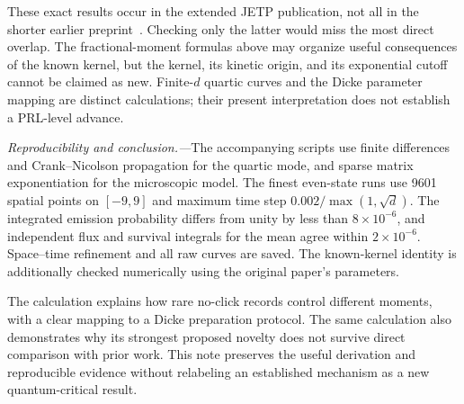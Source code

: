 \documentclass[aps,prl,reprint,superscriptaddress,nofootinbib]{revtex4-2}
\begin{document}
These exact results occur in the extended JETP publication, not all in the shorter earlier preprint~\cite{Efremov}. Checking only the latter would miss the most direct overlap. The fractional-moment formulas above may organize useful consequences of the known kernel, but the kernel, its kinetic origin, and its exponential cutoff cannot be claimed as new. Finite-$d$ quartic curves and the Dicke parameter mapping are distinct calculations; their present interpretation does not establish a PRL-level advance.

\emph{Reproducibility and conclusion.---}The accompanying scripts use finite differences and Crank--Nicolson propagation for the quartic mode, and sparse matrix exponentiation for the microscopic model. The finest even-state runs use 9601 spatial points on $[-9,9]$ and maximum time step $0.002/\max(1,\sqrt d)$. The integrated emission probability differs from unity by less than $8\times10^{-6}$, and independent flux and survival integrals for the mean agree within $2\times10^{-6}$. Space--time refinement and all raw curves are saved. The known-kernel identity is additionally checked numerically using the original paper's parameters.

The calculation explains how rare no-click records control different moments, with a clear mapping to a Dicke preparation protocol. The same calculation also demonstrates why its strongest proposed novelty does not survive direct comparison with prior work. This note preserves the useful derivation and reproducible evidence without relabeling an established mechanism as a new quantum-critical result.


\end{document}
